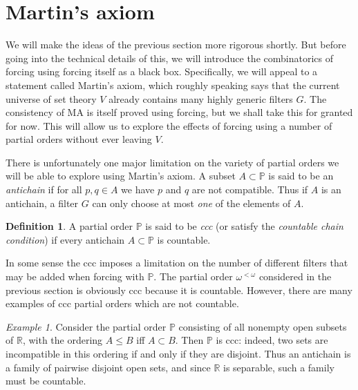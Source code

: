 \documentclass[11pt,oneside]{amsbook}
\newcommand{\PP}{\mathbb P}
\newcommand{\RR}{\mathbb R}
\theoremstyle{definition}
\theoremstyle{plain}
\theoremstyle{definition}
\newtheorem{defn}[thm]{Definition}
\theoremstyle{remark}
\newtheorem{example}[thm]{Example}
\numberwithin{equation}{section}
\numberwithin{figure}{section}
\begin{document}


\section{Martin's axiom}

We will make the ideas of the previous section more rigorous shortly. But before going into the technical details of this, we will introduce the combinatorics of forcing using forcing itself as a black box. Specifically, we will appeal to a statement called Martin's axiom, which roughly speaking says that the current universe of set theory $V$ already contains many highly generic filters $G$. The consistency of MA is itself proved using forcing, but we shall take this for granted for now. This will allow us to explore the effects of forcing using a number of partial orders without ever leaving $V$.

There is unfortunately one major limitation on the variety of partial orders we will be able to explore using Martin's axiom. A subset $A\subset\PP$ is said to be an \emph{antichain} if for all $p,q\in A$ we have $p$ and $q$ are not compatible. Thus if $A$ is an antichain, a filter $G$ can only choose at most \emph{one} of the elements of $A$.

\begin{defn}
  A partial order $\PP$ is said to be \emph{ccc} (or satisfy the \emph{countable chain condition}) if every antichain $A\subset\PP$ is countable.
\end{defn}

In some sense the ccc imposes a limitation on the number of different filters that may be added when forcing with $\PP$. The partial order $\omega^{<\omega}$ considered in the previous section is obviously ccc because it is countable. However, there are many examples of ccc partial orders which are not countable.

\begin{example}
  \label{ex:cohen-ccc}
  Consider the partial order $\PP$ consisting of all nonempty open subsets of $\RR$, with the ordering $A\leq B$ iff $A\subset B$. Then $\PP$ is ccc: indeed, two sets are incompatible in this ordering if and only if they are disjoint. Thus an antichain is a family of pairwise disjoint open sets, and since $\RR$ is separable, such a family must be countable.
\end{example}
\end{document}
